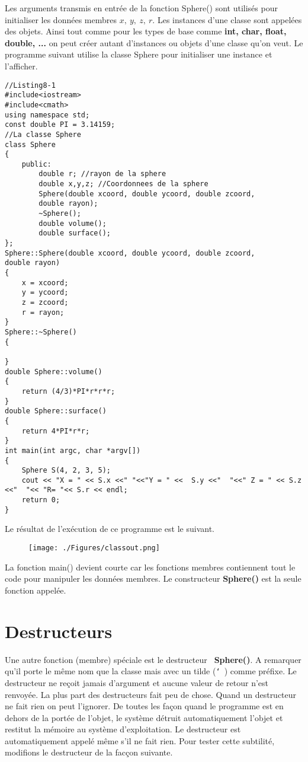 \documentclass[a4paper, oneside,11pt]{book}
\begin{document}
Les arguments transmis en entr\'ee de la fonction Sphere() sont utilis\'es pour initialiser les donn\'ees membres $x,\ y,\ z,\ r$. Les instances d'une classe sont appel\'ees des
objets. Ainsi tout comme pour les types de base comme \textbf{int, char, float, double, ...} on peut  cr\'eer autant d'instances ou objets d'une classe qu'on veut.  
Le programme suivant utilise la classe Sphere pour initialiser une instance et l'afficher.

\begin{lstlisting}
//Listing8-1
#include<iostream>
#include<cmath>
using namespace std;
const double PI = 3.14159;
//La classe Sphere
class Sphere
{
    public:
        double r; //rayon de la sphere
        double x,y,z; //Coordonnees de la sphere
        Sphere(double xcoord, double ycoord, double zcoord, 
        double rayon);
        ~Sphere();
        double volume();
        double surface();
};
Sphere::Sphere(double xcoord, double ycoord, double zcoord, 
double rayon)
{
    x = xcoord;
    y = ycoord;
    z = zcoord;
    r = rayon;
}
Sphere::~Sphere()
{

}
double Sphere::volume()
{
    return (4/3)*PI*r*r*r;
}
double Sphere::surface()
{
    return 4*PI*r*r;
}
int main(int argc, char *argv[])
{
    Sphere S(4, 2, 3, 5);
    cout << "X = " << S.x <<" "<<"Y = " <<  S.y <<"  "<<" Z = " << S.z <<"  "<< "R= "<< S.r << endl;
    return 0;
}
\end{lstlisting} 

Le r\'esultat de l'ex\'ecution de ce programme est le suivant. 

\begin{figure}[hhhh]
\begin{center}
\texttt{[image: ./Figures/classout.png]}
\end{center}
\end{figure}

La fonction main() devient courte car les fonctions membres contiennent tout le code pour manipuler les 
donn\'ees membres. Le constructeur \textbf{Sphere()} est  la seule fonction appel\'ee. 
\section{Destructeurs}
Une autre fonction (membre)  sp\'eciale est le destructeur \texttt{~}\textbf{Sphere()}.  A remarquer qu'il porte le m\^eme nom que la classe mais avec un tilde (\texttt{\char`~}) comme 
pr\'efixe. Le destructeur ne re\c{c}oit jamais d'argument et aucune valeur de retour n'est renvoy\'ee. La plus part des destructeurs fait peu de chose. Quand un destructeur ne fait
rien on peut l'ignorer. De toutes les  fa\c{c}on quand le programme est en dehors de la port\'ee de l'objet, le syst\`eme d\'etruit automatiquement l'objet et restitut la m\'emoire
au syst\`eme d'exploitation.
Le destructeur est automatiquement appel\'e m\^eme s'il ne fait rien. Pour tester cette subtilit\'e, modifions le destructeur de la fac\c{c}on suivante.
\end{document}
